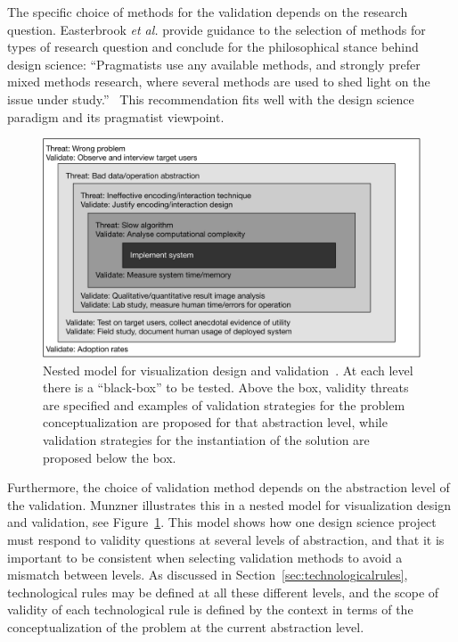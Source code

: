 \documentclass[graybox]{svmult}
\begin{document}
The specific choice of methods for the validation depends on the research question. Easterbrook \emph{et al.} provide guidance to the selection of methods for types of research question and conclude for the philosophical stance behind design science: ``Pragmatists use any available methods, and strongly prefer mixed methods research, where several methods are used to shed light on the issue under study.''~\cite{easterbrook_selecting_2008} 
This recommendation fits well with the design science paradigm and its pragmatist viewpoint.

\begin{figure}[t]
  \includegraphics[width=\textwidth]{Figures/nested_model.pdf}
\caption{Nested model for visualization design and validation~\cite{munzner2009}. At each level there is a ``black-box'' to be tested. Above the box, validity threats are specified and examples of validation strategies for the problem conceptualization are proposed for that abstraction level, while validation strategies for the instantiation of the solution are proposed below the box.}\label{fig:nested_model}       %
\end{figure} 

Furthermore, the choice of validation method depends on the abstraction level of the validation. Munzner illustrates this in a nested model for visualization design and validation, see Figure~\ref{fig:nested_model}. This model shows how one design science project must respond to validity questions at several levels of abstraction, and that it is important to be consistent when selecting validation methods to avoid a mismatch between levels. As discussed in Section~\ref{sec:technologicalrules}, technological rules may be defined at all these different levels, and the scope of validity of each technological rule is defined by the context in terms of the conceptualization of the problem at the current abstraction level.
\end{document}
